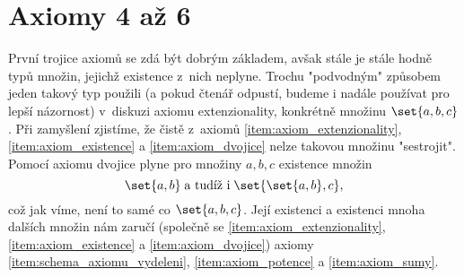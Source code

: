 \section{Axiomy 4 až 6}\label{sec:axiomy_4_az_6}
První trojice axiomů se zdá být dobrým základem, avšak stále je stále hodně typů množin, jejichž existence z~nich neplyne. Trochu "podvodným" způsobem jeden takový typ použili (a pokud čtenář odpustí, budeme i nadále používat pro lepší názornost) v~diskuzi axiomu extenzionality, konkrétně množinu $\set{a,b,c}$. Při zamyšlení zjistíme, že čistě z~axiomů \ref{item:axiom_extenzionality}, \ref{item:axiom_existence} a \ref{item:axiom_dvojice} nelze takovou množinu "sestrojit". Pomocí axiomu dvojice plyne pro množiny $a,b,c$ existence množin
\begin{equation*}
    \set{a,b}\;\text{a tudíž i}\;\set{\set{a,b},c},
\end{equation*}
což jak víme, není to samé co $\set{a,b,c}$. Její existenci a existenci mnoha dalších množin nám zaručí (společně se \ref{item:axiom_extenzionality}, \ref{item:axiom_existence} a \ref{item:axiom_dvojice}) axiomy \ref{item:schema_axiomu_vydeleni}, \ref{item:axiom_potence} a \ref{item:axiom_sumy}.

